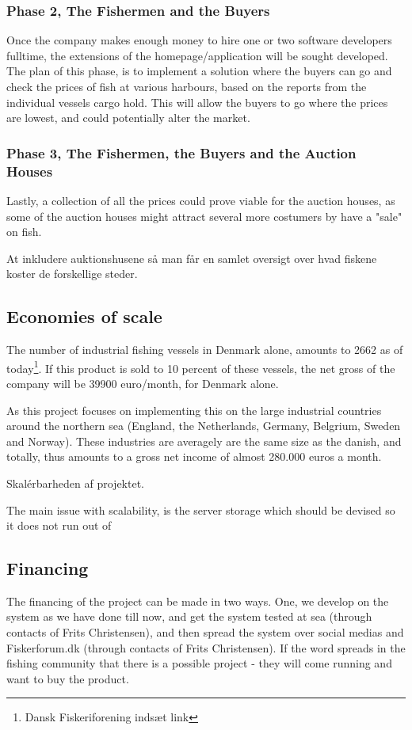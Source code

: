 \documentclass[a4paper,10pt,dateno,oneside,fleqn,sigleft]{newlfm} %
\begin{document}
\begin{newlfm}
\subsubsection{Phase 2, The Fishermen and the Buyers}
Once the company makes enough money to hire one or two software developers fulltime, the extensions of the homepage/application will be sought developed. The plan of this phase, is to implement a solution where the buyers can go and check the prices of fish at various harbours, based on the reports from the individual vessels cargo hold. This will allow the buyers to go where the prices are lowest, and could potentially alter the market. 

\subsubsection{Phase 3, The Fishermen, the Buyers and the Auction Houses}
Lastly, a collection of all the prices could prove viable for the auction houses, as some of the auction houses might attract several more costumers by have a "sale" on fish.

At inkludere auktionshusene så man får en samlet oversigt over hvad fiskene koster de forskellige steder.

\subsection{Economies of scale}
The number of industrial fishing vessels in Denmark alone, amounts to 2662 as of today\footnote{Dansk Fiskeriforening indsæt link}. If this product is sold to 10 percent of these vessels, the net gross of the company will be 39900 euro/month, for Denmark alone.

As this project focuses on implementing this on the large industrial countries around the northern sea (England, the Netherlands, Germany, Belgrium, Sweden and Norway). These industries are averagely are the same size as the danish, and totally, thus amounts to a gross net income of almost 280.000 euros a month. 

Skalérbarheden af projektet. 

The main issue with scalability, is the server storage which should be devised so it does not run out of 

\subsection{Financing}
The financing of the project can be made in two ways. One, we develop on the system as we have done till now, and get the system tested at sea (through contacts of Frits Christensen), and then spread the system over social medias and Fiskerforum.dk (through contacts of Frits Christensen). If the word spreads in the fishing community that there is a possible project - they will come running and want to buy the product. 


\end{newlfm}
\end{document}
